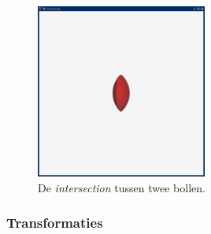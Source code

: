 \documentclass[12pt, a4paper]{article}
\begin{document}
\begin{figure}[H]
    \centering
    \includegraphics[width=0.50\textwidth]{renders/intersection.png}
    \caption{De \emph{intersection} tussen twee bollen.}
    \label{fig:intersection}
\end{figure}
\subsubsection{Transformaties}
\end{document}
